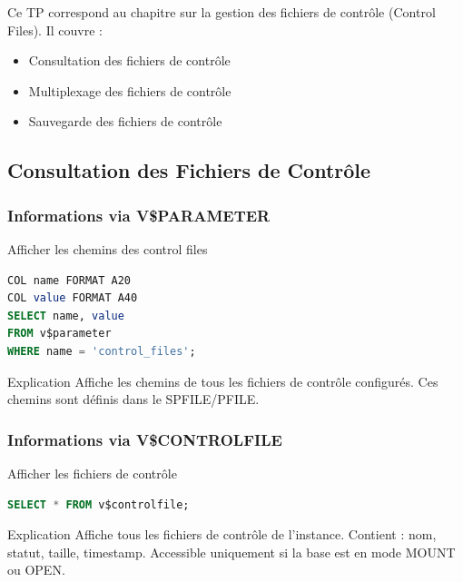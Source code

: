 \documentclass[12pt,a4paper]{article}
\begin{document}
Ce TP correspond au chapitre sur la gestion des fichiers de contrôle (Control Files). Il couvre :
\begin{itemize}
    \item Consultation des fichiers de contrôle
    \item Multiplexage des fichiers de contrôle
    \item Sauvegarde des fichiers de contrôle
\end{itemize}

\subsection{Consultation des Fichiers de Contrôle}

\subsubsection{Informations via V\$PARAMETER}

\begin{commande}{Afficher les chemins des control files}
\begin{lstlisting}[language=SQL]
COL name FORMAT A20
COL value FORMAT A40
SELECT name, value 
FROM v$parameter 
WHERE name = 'control_files';
\end{lstlisting}
\end{commande}

\begin{explication}{Explication}
Affiche les chemins de tous les fichiers de contrôle configurés. Ces chemins sont définis dans le SPFILE/PFILE.
\end{explication}

\subsubsection{Informations via V\$CONTROLFILE}

\begin{commande}{Afficher les fichiers de contrôle}
\begin{lstlisting}[language=SQL]
SELECT * FROM v$controlfile;
\end{lstlisting}
\end{commande}

\begin{explication}{Explication}
Affiche tous les fichiers de contrôle de l'instance. Contient : nom, statut, taille, timestamp. Accessible uniquement si la base est en mode MOUNT ou OPEN.
\end{explication}
\end{document}
